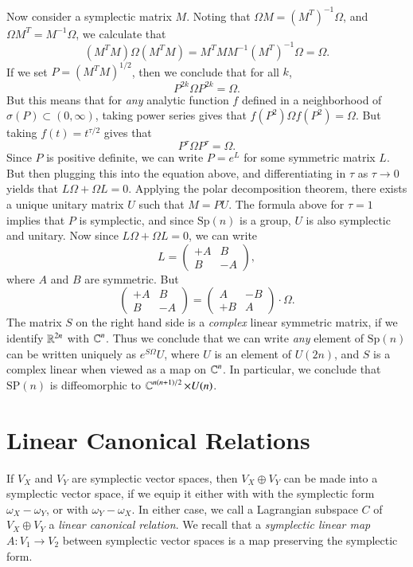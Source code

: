 Now consider a symplectic matrix $M$. Noting that $\Omega M = (M^T)^{-1} \Omega$, and $\Omega M^T = M^{-1} \Omega$, we calculate that
%
\[ (M^T M) \Omega (M^T M) = M^T M M^{-1} (M^T)^{-1} \Omega = \Omega. \]
%
If we set $P = (M^T M)^{1/2}$, then we conclude that for all $k$,
%
\[ P^{2k} \Omega P^{2k} = \Omega. \]
%
But this means that for \emph{any} analytic function $f$ defined in a neighborhood of $\sigma(P) \subset (0,\infty)$, taking power series gives that $f(P^2) \Omega f(P^2) = \Omega$. But taking $f(t) = t^{\tau / 2}$ gives that
%
\[ P^\tau \Omega P^\tau = \Omega. \]
%
Since $P$ is positive definite, we can write $P = e^L$ for some symmetric matrix $L$. But then plugging this into the equation above, and differentiating in $\tau$ as $\tau \to 0$ yields that $L \Omega + \Omega L = 0$. Applying the polar decomposition theorem, there exists a unique unitary matrix $U$ such that $M = PU$. The formula above for $\tau = 1$ implies that $P$ is symplectic, and since $\text{Sp}(n)$ is a group, $U$ is also symplectic and unitary. Now since $L \Omega + \Omega L = 0$, we can write
%
\[ L = \begin{pmatrix} +A & B \\ B & -A \end{pmatrix}, \]
%
where $A$ and $B$ are symmetric. But
%
\[ \begin{pmatrix} +A & B \\ B & -A \end{pmatrix} = \begin{pmatrix} A & -B \\ +B & A \end{pmatrix} \cdot \Omega. \]
%
The matrix $S$ on the right hand side is a \emph{complex} linear symmetric matrix, if we identify $\operatorname{\mathbb{R}}^{2n}$ with $\operatorname{\mathbb{C}}^n$. Thus we conclude that we can write \emph{any} element of $\text{Sp}(n)$ can be written uniquely as $e^{S \Omega} U$, where $U$ is an element of $U(2n)$, and $S$ is a complex linear when viewed as a map on $\operatorname{\mathbb{C}}^n$. In particular, we conclude that $\text{SP}(n)$ is diffeomorphic to $\operatorname{\mathbb{C}}^{n(n+1)/2} \times U(n)$.

\section{Linear Canonical Relations}

If $V_X$ and $V_Y$ are symplectic vector spaces, then $V_X \oplus V_Y$ can be made into a symplectic vector space, if we equip it either with with the symplectic form $\omega_X - \omega_Y$, or with $\omega_Y - \omega_X$. In either case, we call a Lagrangian subspace $C$ of $V_X \oplus V_Y$ a \emph{linear canonical relation}. We recall that a \emph{symplectic linear map} $A: V_1 \to V_2$ between symplectic vector spaces is a map preserving the symplectic form.

